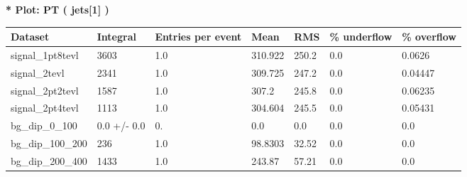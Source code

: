 \documentclass[a4paper, 10pt]{article}
\begin{document}
\textbf{* Plot: PT ( jets[1] ) }\\
   \begin{table}[H]
  \begin{center}
    \begin{tabular}{|m{23.0mm}|m{23.0mm}|m{18.0mm}|m{19.0mm}|m{19.0mm}|m{19.0mm}|m{19.0mm}|}
      \hline
      {\cellcolor{yellow}         Dataset}& {\cellcolor{yellow}         Integral}& {\cellcolor{yellow}         Entries per event}& {\cellcolor{yellow}         Mean}& {\cellcolor{yellow}         RMS}& {\cellcolor{yellow}         \% underflow}& {\cellcolor{yellow}         \% overflow}\\
      \hline
      {\cellcolor{white}         signal\_1pt8tevl}& {\cellcolor{white}         3603}& {\cellcolor{white}         1.0}& {\cellcolor{white}         310.922}& {\cellcolor{white}         250.2}& {\cellcolor{green}         0.0}& {\cellcolor{green}         0.0626}\\
      \hline
      {\cellcolor{white}         signal\_2tevl}& {\cellcolor{white}         2341}& {\cellcolor{white}         1.0}& {\cellcolor{white}         309.725}& {\cellcolor{white}         247.2}& {\cellcolor{green}         0.0}& {\cellcolor{green}         0.04447}\\
      \hline
      {\cellcolor{white}         signal\_2pt2tevl}& {\cellcolor{white}         1587}& {\cellcolor{white}         1.0}& {\cellcolor{white}         307.2}& {\cellcolor{white}         245.8}& {\cellcolor{green}         0.0}& {\cellcolor{green}         0.06235}\\
      \hline
      {\cellcolor{white}         signal\_2pt4tevl}& {\cellcolor{white}         1113}& {\cellcolor{white}         1.0}& {\cellcolor{white}         304.604}& {\cellcolor{white}         245.5}& {\cellcolor{green}         0.0}& {\cellcolor{green}         0.05431}\\
      \hline
      {\cellcolor{white}         bg\_dip\_0\_100}& {\cellcolor{white}         0.0 +/\-- 0.0}& {\cellcolor{white}         0.}& {\cellcolor{white}         0.0}& {\cellcolor{white}         0.0}& {\cellcolor{green}         0.0}& {\cellcolor{green}         0.0}\\
      \hline
      {\cellcolor{white}         bg\_dip\_100\_200}& {\cellcolor{white}         236}& {\cellcolor{white}         1.0}& {\cellcolor{white}         98.8303}& {\cellcolor{white}         32.52}& {\cellcolor{green}         0.0}& {\cellcolor{green}         0.0}\\
      \hline
      {\cellcolor{white}         bg\_dip\_200\_400}& {\cellcolor{white}         1433}& {\cellcolor{white}         1.0}& {\cellcolor{white}         243.87}& {\cellcolor{white}         57.21}& {\cellcolor{green}         0.0}& {\cellcolor{green}         0.0}\\

\end{tabular}
\end{center}
\end{table}
\end{document}
